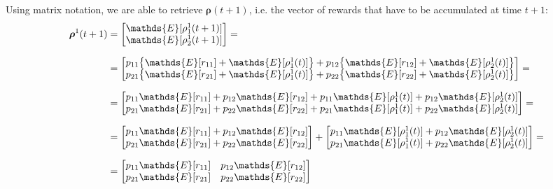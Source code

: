 \documentclass[\main/main.tex]{subfiles}
\begin{document}
Using matrix notation, we are able to retrieve $\bm{\rho}(t+1)$, i.e. the vector of rewards that have to be accumulated at time $t+1$:
\begin{equation}
\setlength{\jot}{10pt}
\begin{split}
    \bm{\rho}^1(t+1) &=       
\begin{bmatrix}
      \mathds{E}[\rho_1^1(t+1)]\\
      \mathds{E}[\rho_2^1(t+1)]\\
\end{bmatrix}= \\
  &= 
 \begin{bmatrix} 
 p_{11} \big\{ \mathds{E}[r_{11}]  + \mathds{E}[\rho_1^1(t)]\big\} + p_{12}\big\{ \mathds{E}[r_{12}]  + \mathds{E}[\rho_2^1(t)]\big\}\\
  p_{21} \big\{ \mathds{E}[r_{21}]  + \mathds{E}[\rho_1^1(t)]\big\} + p_{22}\big\{ \mathds{E}[r_{22}]  + \mathds{E}[\rho_2^1(t)]\big\} \\
 \end{bmatrix} =\\
  &=  
 \begin{bmatrix} 
 p_{11}\mathds{E}[r_{11}]  +  p_{12}\mathds{E}[r_{12}] + p_{11}\mathds{E}[\rho_1^1(t)] + p_{12}\mathds{E}[\rho_2^1(t)]\\
 p_{21}\mathds{E}[r_{21}] + 
 p_{22} \mathds{E}[r_{22}] + p_{21}\mathds{E}[\rho_1^1(t)] + 
 p_{22}\mathds{E}[\rho_2^1(t)]\\
 \end{bmatrix} =\\
  &=  
 \begin{bmatrix} 
 p_{11}\mathds{E}[r_{11}]  +  p_{12}\mathds{E}[r_{12}]\\
 p_{21}\mathds{E}[r_{21}] + 
 p_{22} \mathds{E}[r_{22}]\\
 \end{bmatrix}
 + 
 \begin{bmatrix} 
 p_{11}\mathds{E}[\rho_1^1(t)] + p_{12}\mathds{E}[\rho_2^1(t)] \\
 p_{21}\mathds{E}[\rho_1^1(t)] + 
 p_{22}\mathds{E}[\rho_2^1(t)]\\
 \end{bmatrix} =\\
  &= 
 \begin{bmatrix} 
 p_{11}\mathds{E}[r_{11}] & p_{12}\mathds{E}[r_{12}]\\
 p_{21}\mathds{E}[r_{21}] & 
 p_{22} \mathds{E}[r_{22}]\\
 \end{bmatrix}

\end{split}
\end{equation}
\end{document}
